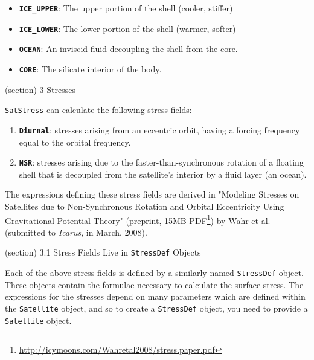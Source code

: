     \begin{itemize}
    \setlength{\parskip}{0.6ex}
      \item \textbf{\texttt{ICE\_UPPER}}: The upper portion of the shell 
        (cooler, stiffer)

      \item \textbf{\texttt{ICE\_LOWER}}: The lower portion of the shell 
        (warmer, softer)

      \item \textbf{\texttt{OCEAN}}: An inviscid fluid decoupling the shell 
        from the core.

      \item \textbf{\texttt{CORE}}: The silicate interior of the body.

    \end{itemize}

(section) 3 Stresses

  \texttt{SatStress} can calculate the following stress fields:

  \begin{enumerate}

  \setlength{\parskip}{0.5ex}
    \item \textbf{\texttt{Diurnal}}: stresses arising from an eccentric orbit, 
      having a forcing frequency equal to the orbital frequency.

    \item \textbf{\texttt{NSR}}: stresses arising due to the 
      faster-than-synchronous rotation of a floating shell that is 
      decoupled from the satellite's interior by a fluid layer (an ocean).

  \end{enumerate}

  The expressions defining these stress fields are derived in "Modeling 
  Stresses on Satellites due to Non-Synchronous Rotation and Orbital 
  Eccentricity Using Gravitational Potential Theory" (preprint, 15MB 
  PDF\footnote{\href{http://icymoons.com/Wahretal2008/stress.paper.pdf}{http://icymoons.com/Wahretal2008/stress.paper.pdf}})
  by Wahr et al. (submitted to \textit{Icarus}, in March, 2008).

  (section) 3.1 Stress Fields Live in \texttt{StressDef} Objects

    Each of the above stress fields is defined by a similarly named 
    \texttt{StressDef} object.  These objects contain the formulae 
    necessary to calculate the surface stress.  The expressions for the 
    stresses depend on many parameters which are defined within the 
    \texttt{Satellite} object, and so to create a \texttt{StressDef} 
    object, you need to provide a \texttt{Satellite} object.

